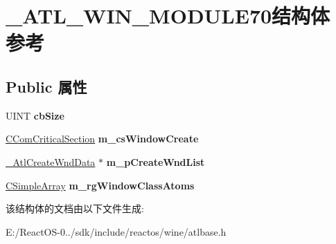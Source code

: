 \hypertarget{struct___a_t_l___w_i_n___m_o_d_u_l_e70}{}\section{\+\_\+\+A\+T\+L\+\_\+\+W\+I\+N\+\_\+\+M\+O\+D\+U\+L\+E70结构体 参考}
\label{struct___a_t_l___w_i_n___m_o_d_u_l_e70}
\subsection*{Public 属性}
\begin{DoxyCompactItemize}
\item 
\mbox{\label{struct___a_t_l___w_i_n___m_o_d_u_l_e70_aca4eaa65a3439ecfaa9b94aac5bb9da1}} 
U\+I\+NT {\bfseries cb\+Size}
\item 
\mbox{\label{struct___a_t_l___w_i_n___m_o_d_u_l_e70_aca94238385c8dfacf86c8131544be971}} 
\hyperlink{struct___c_r_i_t_i_c_a_l___s_e_c_t_i_o_n}{C\+Com\+Critical\+Section} {\bfseries m\+\_\+cs\+Window\+Create}
\item 
\mbox{\label{struct___a_t_l___w_i_n___m_o_d_u_l_e70_ae22d455904bbebbdeedf08153ef29537}} 
\hyperlink{struct___atl_create_wnd_data___t_a_g}{\+\_\+\+Atl\+Create\+Wnd\+Data} $\ast$ {\bfseries m\+\_\+p\+Create\+Wnd\+List}
\item 
\mbox{\label{struct___a_t_l___w_i_n___m_o_d_u_l_e70_a5d433f2cc4ba8168e6aa14e278af570a}} 
\hyperlink{struct_c_simple_array}{C\+Simple\+Array} {\bfseries m\+\_\+rg\+Window\+Class\+Atoms}
\end{DoxyCompactItemize}


该结构体的文档由以下文件生成\+:\begin{DoxyCompactItemize}
\item 
E\+:/\+React\+O\+S-\/0../sdk/include/reactos/wine/atlbase.\+h\end{DoxyCompactItemize}
